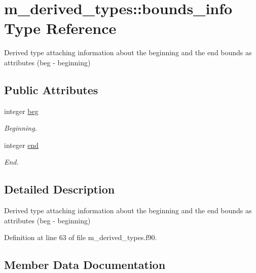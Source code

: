 \hypertarget{structm__derived__types_1_1bounds__info}{}\section{m\+\_\+derived\+\_\+types\+:\+:bounds\+\_\+info Type Reference}
\label{structm__derived__types_1_1bounds__info}


Derived type attaching information about the beginning and the end bounds as attributes (beg -\/ beginning)  


\subsection*{Public Attributes}
\begin{DoxyCompactItemize}
\item 
integer \hyperlink{structm__derived__types_1_1bounds__info_a2e2ca507eb176129988d49544fbe9020}{beg}
\begin{DoxyCompactList}\small\item\em Beginning. \end{DoxyCompactList}\item 
integer \hyperlink{structm__derived__types_1_1bounds__info_a7bc03a7a90da94d38e6656d65281bc35}{end}
\begin{DoxyCompactList}\small\item\em End. \end{DoxyCompactList}\end{DoxyCompactItemize}


\subsection{Detailed Description}
Derived type attaching information about the beginning and the end bounds as attributes (beg -\/ beginning) 

Definition at line 63 of file m\+\_\+derived\+\_\+types.\+f90.



\subsection{Member Data Documentation}
\mbox{\label{structm__derived__types_1_1bounds__info_a2e2ca507eb176129988d49544fbe9020}} 
